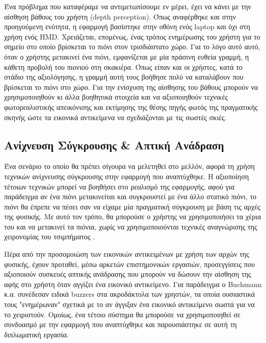Ένα πρόβλημα που καταφέραμε να αντιμετωπίσουμε εν μέρει, έχει να κάνει με την αίσθηση βάθους του χρήστη (depth perception). Όπως αναφέρθηκε και στην προηγούμενη ενότητα, η εφαρμογή βασίστηκε στην οθόνη ενός laptop και όχι στη χρήση ενός HMD. Χρειάζεται, επομένως, ένας τρόπος ενημέρωσης του χρήστη για το σημείο στο οποίο βρίσκεται το πιόνι στον τρισδιάστατο χώρο. Για το λόγο αυτό αυτό, όταν ο χρήστης μετακινεί ένα πιόνι, εμφανίζεται με μία πράσινη ευθεία γραμμή, η κάθετη προβολή του πιονιού στη σκακιέρα. Όπως είπαν και οι χρήστες, κατά το στάδιο της αξιολόγησης, η γραμμή αυτή τους βοήθησε πολύ να καταλάβουν που βρίσκεται το πιόνι στο χώρο. Για την ενίσχυση της αίσθησης του βάθους μπορούν να χρησιμοποιηθούν κι άλλα βοηθητικά στοιχεία και να αξιοποιηθούν τεχνικές φωτορεαλιστικής απεικόνισης και εκτίμησης της θέσης πηγής φωτός της πραγματικής σκηνής \cite{frahm2005markerless} \cite{agusanto2003photorealistic} ώστε τα εικονικά αντικείμενα να σχεδιάζονται με τις σωστές σκιές.


\subsection{Ανίχνευση Σύγκρουσης \& Απτική Ανάδραση }


Ένα σενάριο το οποίο θα πρέπει σίγουρα να μελετηθεί στο μελλόν, αφορά τη χρήση τεχνικών ανίχνευσης σύγκρουσης στην εφαρμογή που αναπτύχθηκε. Η αξιοποίηση τέτοιων τεχνικών μπορεί να βοηθήσει στο ρεαλισμό της εφαρμογής, αφού για παράδειγμα αν ένα πιόνι μετακινείται και συγκρουστεί με ένα άλλο στατικό πιόνι, το πιόνι θα έπρεπε να πέσει σαν να είχαμε μία πραγματική σύγκρουση με βάση τις αρχές της φυσικής. Με αυτό τον τρόπο, θα μπορούσε ο χρήστης να χρησιμοποιήσει τα χέρια του και να μετακινεί τα πιόνια, χωρίς να χρησιμοποιούνται τεχνικές αναγνώρισης της χειρονομίας του τσιμπήματος \cite{Song2008}.


Πέρα από την προσομοιώση των εικονικών αντικειμένων με χρήση των αρχών της φυσικής, έχουν προταθεί, μέσω αρκετών επιστημονικών εργασιών, προσεγγίσεις που αξιοποιούν συσκευές απτικής ανάδρασης που μπορούν να δώσουν την αίσθηση της αφής στο χρήστη όταν αγγίζει ένα εικονικό αντικείμενο. Για παράδειγμα ο Buchmann κ.α. \cite{Buchmann2004} συνέδεσαν ειδικά buzzers στα ακροδάκτυλα των χρηστών, τα οποία ουσιαστικά τους "ενημέρωναν" σχετικά με το αν άγγιξαν ένα εικονικό αντικείμενο σωστά για να το χειριστούν. Ομοίως, ένα τέτοιο σύστημα θα μπορούσε να χρησιμοποιηθεί σε συνδυασμό με την εφαρμογή που αναπτύχθηκε και παρουσιάστηκε σε αυτή τη διπλωματική εργασία.



